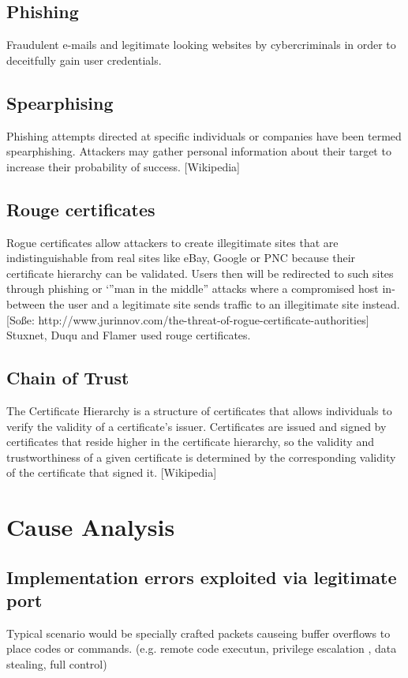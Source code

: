 \documentclass[a4paper, 12pt]{article}
\begin{document}
\subsection{Phishing}
Fraudulent e-mails and legitimate looking websites by cybercriminals in order to deceitfully gain user credentials.
\subsection{Spearphising}
Phishing attempts directed at specific individuals or companies have been termed spearphishing. Attackers may gather personal information about their target to increase their probability of success. [Wikipedia]
\subsection{Rouge certificates}
Rogue certificates allow attackers to create illegitimate sites that are indistinguishable from real sites like eBay, Google or PNC because their certificate hierarchy can be validated.  Users then will be redirected to such sites through phishing or ‘”man in the middle” attacks where a compromised host in-between the user and a legitimate site sends traffic to an illegitimate site instead.
[Soße: http://www.jurinnov.com/the-threat-of-rogue-certificate-authorities]
Stuxnet, Duqu and Flamer used rouge certificates.
\subsection{Chain of Trust}
The Certificate Hierarchy is a structure of certificates that allows individuals to verify the validity of a certificate's issuer. Certificates are issued and signed by certificates that reside higher in the certificate hierarchy, so the validity and trustworthiness of a given certificate is determined by the corresponding validity of the certificate that signed it.
[Wikipedia]
\section{Cause Analysis}
\subsection{Implementation errors exploited via legitimate port}
Typical scenario would be specially crafted packets causeing buffer overflows to place codes or commands. (e.g. remote code executun, privilege escalation , data stealing, full control)
\end{document}
